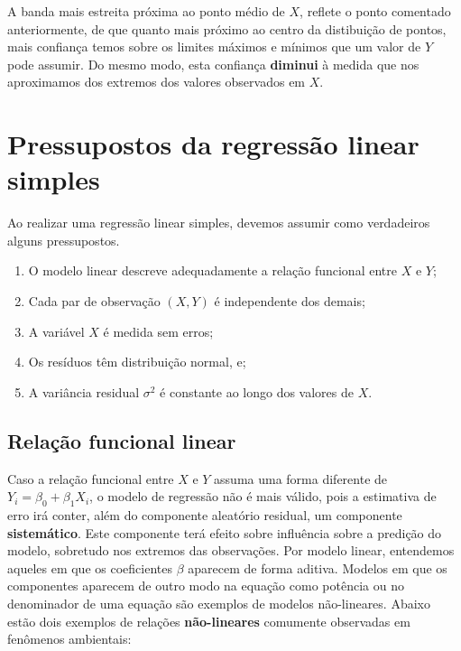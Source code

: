 \documentclass[
]{book}
\providecommand{\tightlist}{%
  \setlength{\itemsep}{0pt}\setlength{\parskip}{0pt}}
\begin{document}
A banda mais estreita próxima ao ponto médio de \(X\), reflete o ponto comentado anteriormente, de que quanto mais próximo ao centro da distibuição de pontos, mais confiança temos sobre os limites máximos e mínimos que um valor de \(Y\) pode assumir. Do mesmo modo, esta confiança \textbf{diminui} à medida que nos aproximamos dos extremos dos valores observados em \(X\).

\hypertarget{pressupostos-da-regressuxe3o-linear-simples}{%
\section{Pressupostos da regressão linear simples}\label{pressupostos-da-regressuxe3o-linear-simples}}

Ao realizar uma regressão linear simples, devemos assumir como verdadeiros alguns pressupostos.

\begin{enumerate}
\def\labelenumi{\arabic{enumi}.}
\tightlist
\item
  O modelo linear descreve adequadamente a relação funcional entre \(X\) e \(Y\);
\item
  Cada par de observação \((X,Y)\) é independente dos demais;
\item
  A variável \(X\) é medida sem erros;
\item
  Os resíduos têm distribuição normal, e;
\item
  A variância residual \(\sigma^2\) é constante ao longo dos valores de \(X\).
\end{enumerate}

\hypertarget{relauxe7uxe3o-funcional-linear}{%
\subsection{Relação funcional linear}\label{relauxe7uxe3o-funcional-linear}}

Caso a relação funcional entre \(X\) e \(Y\) assuma uma forma diferente de \(Y_i = \beta_0 + \beta_1X_i\), o modelo de regressão não é mais válido, pois a estimativa de erro irá conter, além do componente aleatório residual, um componente \textbf{sistemático}. Este componente terá efeito sobre influência sobre a predição do modelo, sobretudo nos extremos das observações. Por modelo linear, entendemos aqueles em que os coeficientes \(\beta\) aparecem de forma aditiva. Modelos em que os componentes aparecem de outro modo na equação como potência ou no denominador de uma equação são exemplos de modelos não-lineares. Abaixo estão dois exemplos de relações \textbf{não-lineares} comumente observadas em fenômenos ambientais:
\end{document}
